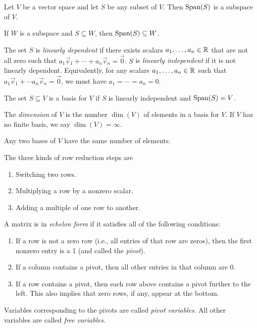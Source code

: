 \begin{fact}
	Let $V$ be a vector space and let $S$ be any subset of $V$. Then
	$\text{Span}(S)$ is a subspace of $V$.
\end{fact}

\begin{fact}
	If $W$ is a subspace and $S \subseteq W$, then $\text{Span}(S) \subseteq W$.
\end{fact}

\begin{definition}
	The set $S$ is \emph{linearly dependent} if there exists scalars $a_1, \dots,
	a_n \in {\mathbb{R}}$ that are not all zero such that $a_1 \vec{v}_1 + \cdots + a_n
	\vec{v}_n = \vec{0}$. $S$ is \emph{linearly independent} if it is not
	linearly dependent. Equivalently, for any scalars $a_1, \dots, a_n \in {\mathbb{R}}$
	such that $a_1 \vec{v}_1 + \cdots a_n \vec{v}_n = \vec{0}$, we must have
	$a_1 = \cdots = a_n = 0$.
\end{definition}

\begin{definition}
	The set $S \subseteq V$ is a basis for $V$ if $S$ is linearly independent
	and $\text{Span}(S) = V$.
\end{definition}

\begin{definition}
	The \emph{dimension} of $V$ is the number $\dim(V)$ of elements in a basis
	for $V$. If $V$ has no finite basis, we say $\dim(V) = \infty$.
\end{definition}

\begin{theorem}
	Any two bases of $V$ have the same number of elements.
\end{theorem}

\begin{fact}
	The three kinds of row reduction steps are
	\begin{enumerate}
		\item Switching two rows.
		\item Multiplying a row by a nonzero scalar.
		\item Adding a multiple of one row to another.
	\end{enumerate}
\end{fact}

\begin{definition}
	A matrix is in \emph{echelon form} if it satisfies all of the following
	conditions:
	\begin{enumerate}
		\item If a row is not a zero row (i.e., all entries of that row are zeros),
			then the first nonzero entry is a 1 (and called the \emph{pivot}).
		\item If a column contains a pivot, then all other entries in that column
			are 0.
		\item If a row contains a pivot, then each row above contains a pivot
			further to the left. This also implies that zero rows, if any, appear at
			the bottom.
	\end{enumerate}
	Variables corresponding to the pivots are called \emph{pivot variables}.
	All other variables are called \emph{free variables}.
\end{definition}

